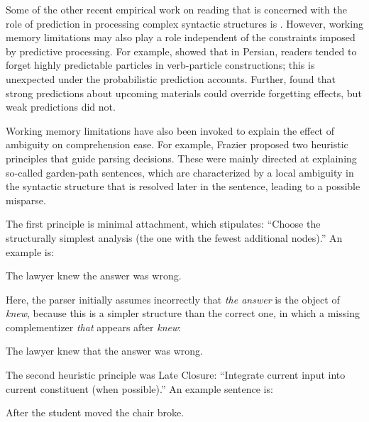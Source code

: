\documentclass{cambridge7A}\usepackage[]{graphicx}\usepackage[]{color}
\begin{document}
Some of the other recent empirical work on
reading that is concerned with the role of prediction in processing
complex syntactic structures is
\cite{levyfedgibsonRussian,levy2012processing,LevyKeller2013,VasishthMertzenJaegerGelman2018,levy2012processing,linzenuncertainty}. However,
 working memory limitations may also play a role independent of
the constraints imposed by predictive processing. For example,
\cite{SafaviEtAlFrontiers2016} showed that in Persian, readers tended
to forget highly predictable particles in verb-particle constructions; 
this is unexpected under the probabilistic prediction
accounts. Further, \cite{HusainEtAl2014} found that strong predictions
about upcoming materials could override forgetting effects, but weak
predictions did not.

Working memory limitations have also been invoked to explain the effect of ambiguity on comprehension ease.
For example, Frazier proposed two heuristic principles that guide parsing
decisions. These were mainly directed at explaining so-called garden-path sentences, which are characterized by a local ambiguity in the syntactic structure that is resolved later in the sentence, leading to a possible misparse.

The first principle is minimal attachment, which stipulates: 
 ``Choose the structurally simplest analysis (the one with the fewest additional nodes).'' An example is:

\begin{exe} 
\ex  \label{ambiguity}
The lawyer knew the answer was wrong.
\end{exe}

Here, the parser initially assumes incorrectly that \textit{the answer} is the object of \textit{knew}, because this is a simpler structure than the correct one, in which a missing complementizer \textit{that} appears after \textit{knew}: 

\begin{exe} 
\ex  \label{ambiguitythat}
The lawyer knew that the answer was wrong.
\end{exe}

The second heuristic principle was Late Closure:  ``Integrate current input into current  constituent (when possible).'' An example sentence is:

\begin{exe} 
\ex  \label{ambiguity2}
After the student moved the chair broke. 
\end{exe}
\end{document}
